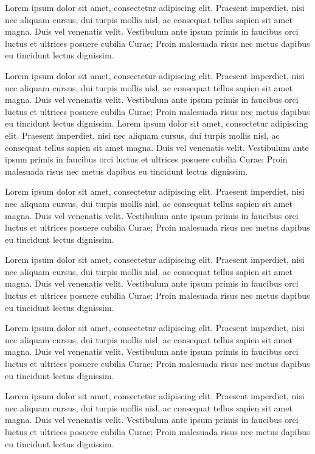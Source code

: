 Lorem ipsum dolor sit amet, consectetur adipiscing elit. Praesent imperdiet, nisi 
nec aliquam cursus, dui turpis mollis nisl, ac consequat tellus sapien sit amet 
magna. Duis vel venenatis velit. Vestibulum ante ipsum primis in faucibus orci 
luctus et ultrices posuere cubilia Curae; Proin malesuada risus nec metus dapibus 
eu tincidunt lectus dignissim. 

Lorem ipsum dolor sit amet, consectetur adipiscing elit. Praesent imperdiet, nisi 
nec aliquam cursus, dui turpis mollis nisl, ac consequat tellus sapien sit amet 
magna. Duis vel venenatis velit. Vestibulum ante ipsum primis in faucibus orci 
luctus et ultrices posuere cubilia Curae; Proin malesuada risus nec metus dapibus 
eu tincidunt lectus dignissim. 
Lorem ipsum dolor sit amet, consectetur adipiscing elit. Praesent imperdiet, nisi 
nec aliquam cursus, dui turpis mollis nisl, ac consequat tellus sapien sit amet 
magna. Duis vel venenatis velit. Vestibulum ante ipsum primis in faucibus orci 
luctus et ultrices posuere cubilia Curae; Proin malesuada risus nec metus dapibus 
eu tincidunt lectus dignissim. 

Lorem ipsum dolor sit amet, consectetur adipiscing elit. Praesent imperdiet, nisi 
nec aliquam cursus, dui turpis mollis nisl, ac consequat tellus sapien sit amet 
magna. Duis vel venenatis velit. Vestibulum ante ipsum primis in faucibus orci 
luctus et ultrices posuere cubilia Curae; Proin malesuada risus nec metus dapibus 
eu tincidunt lectus dignissim. 

Lorem ipsum dolor sit amet, consectetur adipiscing elit. Praesent imperdiet, nisi 
nec aliquam cursus, dui turpis mollis nisl, ac consequat tellus sapien sit amet 
magna. Duis vel venenatis velit. Vestibulum ante ipsum primis in faucibus orci 
luctus et ultrices posuere cubilia Curae; Proin malesuada risus nec metus dapibus 
eu tincidunt lectus dignissim. 

Lorem ipsum dolor sit amet, consectetur adipiscing elit. Praesent imperdiet, nisi 
nec aliquam cursus, dui turpis mollis nisl, ac consequat tellus sapien sit amet 
magna. Duis vel venenatis velit. Vestibulum ante ipsum primis in faucibus orci 
luctus et ultrices posuere cubilia Curae; Proin malesuada risus nec metus dapibus 
eu tincidunt lectus dignissim. 

Lorem ipsum dolor sit amet, consectetur adipiscing elit. Praesent imperdiet, nisi 
nec aliquam cursus, dui turpis mollis nisl, ac consequat tellus sapien sit amet 
magna. Duis vel venenatis velit. Vestibulum ante ipsum primis in faucibus orci 
luctus et ultrices posuere cubilia Curae; Proin malesuada risus nec metus dapibus 
eu tincidunt lectus dignissim. 

